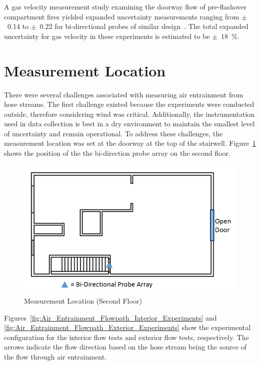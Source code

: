 \documentclass[12pt,oneside]{book}
\begin{document}
A gas velocity measurement study examining the doorway flow of pre-flashover compartment fires yielded expanded uncertainty measurements ranging from $\pm$~0.14 to $\pm$~0.22 for bi-directional probes of similar design~\cite{Bryant:FSJ2009}. The total expanded uncertainty for gas velocity in these experiments is estimated to be $\pm$~18~\%.

\section{Measurement Location}
\label{sec:location}
There were several challenges associated with measuring air entrainment from hose streams. The first challenge existed because the experiments were conducted outside, therefore considering wind was critical. Additionally, the instrumentation used in data collection is best in a dry environment to maintain the smallest level of uncertainty and remain operational. To address these challenges, the measurement location was set at the doorway at the top of the stairwell. Figure~\ref{fig:Measurement_Location_Second_Floor} shows the position of the the bi-direction probe array on the second floor.

\begin{figure}[!ht]
	\centering
	\includegraphics[width=.7\columnwidth]{Figures/Air_Entrainment/Measurement_Locations_Secondfloor}
	\caption{Measurement Location (Second Floor)}
	\label{fig:Measurement_Location_Second_Floor}
\end{figure}

Figures~\ref{fig:Air_Entrainment_Flowpath_Interior_Experiments} and \ref{fig:Air_Entrainment_Flowpath_Exterior_Experiments} show the experimental configuration for the interior flow tests and exterior flow tests, respectively. The arrows indicate the flow direction based on the hose stream being the source of the flow through air entrainment.
\end{document}
